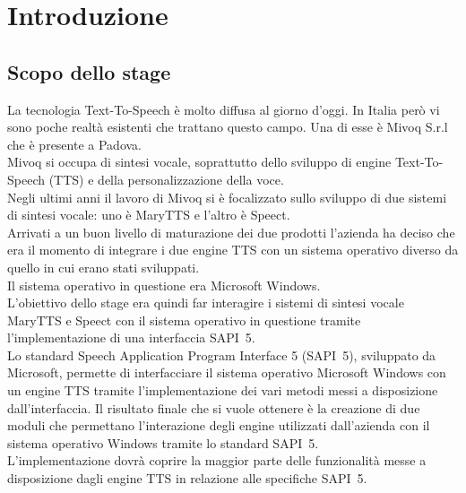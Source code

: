 \chapter{Introduzione} %
\thispagestyle{empty}
\newpage
\section{Scopo dello stage}
La tecnologia Text-To-Speech è molto diffusa al giorno d'oggi. In Italia però vi sono poche realtà esistenti che trattano questo campo. Una di esse è Mivoq S.r.l che è presente a Padova.\\
Mivoq si occupa di sintesi vocale, soprattutto dello sviluppo di engine Text-To-Speech (TTS) e della personalizzazione della voce.\\
Negli ultimi anni il lavoro di Mivoq si è focalizzato sullo sviluppo di due sistemi di sintesi vocale: uno è MaryTTS e l'altro è Speect.\\
Arrivati a un buon livello di maturazione dei due prodotti l'azienda ha deciso che era il momento di integrare i due engine TTS con un sistema operativo diverso da quello in cui erano stati sviluppati.\\
Il sistema operativo in questione era Microsoft Windows.\\
L'obiettivo dello stage era quindi far interagire i sistemi di sintesi vocale MaryTTS e Speect con il sistema operativo in questione tramite l'implementazione di una interfaccia SAPI~5.\\
Lo standard Speech Application Program Interface 5 (SAPI~5), sviluppato da Microsoft, permette di interfacciare il sistema operativo Microsoft Windows con un engine TTS tramite l'implementazione dei vari metodi messi a disposizione dall'interfaccia.
Il risultato finale che si vuole ottenere è la creazione di due moduli che permettano l'interazione degli engine utilizzati dall'azienda con il sistema operativo Windows tramite lo standard SAPI~5.\\
L'implementazione dovrà coprire la maggior parte delle funzionalità messe a disposizione dagli engine TTS in relazione alle specifiche SAPI~5.

